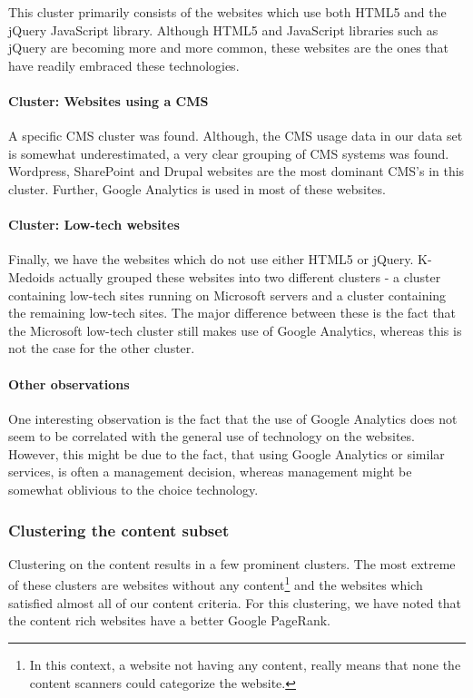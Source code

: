 This cluster primarily consists of the websites which use both {HTML5} and the {jQuery} JavaScript library. Although {HTML5} and JavaScript libraries such as {jQuery} are becoming more and more common, these websites are the ones that have readily embraced these technologies.

\paragraph{Cluster: Websites using a CMS}

A specific {CMS} cluster was found. Although, the {CMS} usage data in our data set is somewhat underestimated, a very clear grouping of {CMS} systems was found. {Wordpress}, {SharePoint} and {Drupal} websites are the most dominant {CMS}'s in this cluster. Further, {Google Analytics} is used in most of these websites.

\paragraph{Cluster: Low-tech websites}

Finally, we have the websites which do not use either {HTML5} or {jQuery}. {K-Medoids} actually grouped these websites into two different clusters - a cluster containing low-tech sites running on {Microsoft} servers and a cluster containing the remaining low-tech sites. The major difference between these is the fact that the {Microsoft} low-tech cluster still makes use of {Google Analytics}, whereas this is not the case for the other cluster.

\paragraph{Other observations}

One interesting observation is the fact that the use of {Google Analytics} does not seem to be correlated with the general use of technology on the websites. However, this might be due to the fact, that using {Google Analytics} or similar services, is often a management decision, whereas management might be somewhat oblivious to the choice technology.

\subsubsection{Clustering the content subset}

Clustering on the content results in a few prominent clusters. The most extreme of these clusters are websites without any content\footnote{In this context, a website not having any content, really means that none the content scanners could categorize the website.} and the websites which satisfied almost all of our content criteria. For this clustering, we have noted that the content rich websites have a better {Google PageRank}.

